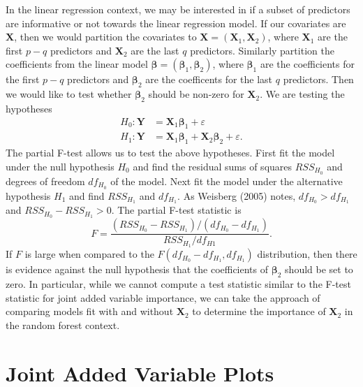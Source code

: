 \documentclass[12pt,twoside]{reedthesis}
\theoremstyle{definition}
\theoremstyle{definition}
\theoremstyle{definition}
\theoremstyle{remark}
\begin{document}
In the linear regression context, we may be interested in if a subset of
predictors are informative or not towards the linear regression model.
If our covariates are \(\mathbf{X}\), then we would partition the
covariates to \(\mathbf{X}=(\mathbf{X}_1,\mathbf{X}_2)\), where
\(\mathbf{X}_1\) are the first \(p-q\) predictors and \(\mathbf{X}_2\)
are the last \(q\) predictors. Similarly partition the coefficients from
the linear model \(\mathbf{\beta}=(\mathbf{\beta}_1,\mathbf{\beta}_2)\),
where \(\mathbf{\beta}_1\) are the coefficients for the first \(p-q\)
predictors and \(\mathbf{\beta}_2\) are the coefficents for the last
\(q\) predictors. Then we would like to test whether
\(\mathbf{\beta}_2\) should be non-zero for \(\mathbf{X}_2\). We are
testing the hypotheses
\begin{align}
H_0: \mathbf{Y}&=\mathbf{X}_1\mathbf{\beta}_1+\varepsilon \nonumber \\
H_1: \mathbf{Y}&=\mathbf{X}_1\mathbf{\beta}_1+\mathbf{X}_2\mathbf{\beta}_2+\varepsilon. \nonumber
\end{align}
The partial F-test allows us to test the above hypotheses. First fit the
model under the null hypothesis \(H_0\) and find the residual sums of
squares \(RSS_{H_0}\) and degrees of freedom \(df_{H_0}\) of the model.
Next fit the model under the alternative hypothesis \(H_1\) and find
\(RSS_{H_1}\) and \(df_{H_1}\). As Weisberg (2005) notes,
\(df_{H_0}>df_{H_1}\) and \(RSS_{H_0}-RSS_{H_1}>0\). The partial F-test
statistic is
\[F=\frac{(RSS_{H_0}-RSS_{H_1})/(df_{H_0}-df_{H_1})}{RSS_{H_1}/df_{H1}}.\]
If \(F\) is large when compared to the
\(F(df_{H_0}-df_{H_1}, df_{H_1})\) distribution, then there is evidence
against the null hypothesis that the coefficients of
\(\mathbf{\beta}_2\) should be set to zero. In particular, while we
cannot compute a test statistic similar to the F-test statistic for
joint added variable importance, we can take the approach of comparing
models fit with and without \(\mathbf{X}_2\) to determine the importance
of \(\mathbf{X}_2\) in the random forest context.

\section{Joint Added Variable Plots}\label{joint-added-variable-plots}
\end{document}
